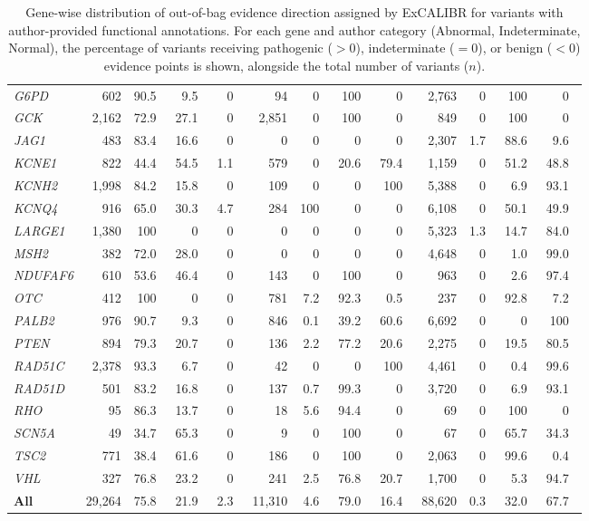 \documentclass[11pt]{article}
\theoremstyle{plain}
\newcommand{\excalibr}{ExCALIBR\xspace}
\begin{document}
\begin{table}[!htb]
{{\begin{tabular}{@{}l rrrr rrrr rrrr@{}}
\textit{G6PD} & 602 & 90.5\ & 9.5\ & 0\ & 94 & 0\ & 100\ & 0\ & 2,763 & 0\ & 100\ & 0\ \\
\textit{GCK} & 2,162 & 72.9\ & 27.1\ & 0\ & 2,851 & 0\ & 100\ & 0\ & 849 & 0\ & 100\ & 0\ \\
\textit{JAG1} & 483 & 83.4\ & 16.6\ & 0\ & 0 & 0\ & 0\ & 0\ & 2,307 & 1.7\ & 88.6\ & 9.6\ \\
\textit{KCNE1} & 822 & 44.4\ & 54.5\ & 1.1\ & 579 & 0\ & 20.6\ & 79.4\ & 1,159 & 0\ & 51.2\ & 48.8\ \\
\textit{KCNH2} & 1,998 & 84.2\ & 15.8\ & 0\ & 109 & 0\ & 0\ & 100\ & 5,388 & 0\ & 6.9\ & 93.1\ \\
\textit{KCNQ4} & 916 & 65.0\ & 30.3\ & 4.7\ & 284 & 100\ & 0\ & 0\ & 6,108 & 0\ & 50.1\ & 49.9\ \\
\textit{LARGE1} & 1,380 & 100\ & 0\ & 0\ & 0 & 0\ & 0\ & 0\ & 5,323 & 1.3\ & 14.7\ & 84.0\ \\
\textit{MSH2} & 382 & 72.0\ & 28.0\ & 0\ & 0 & 0\ & 0\ & 0\ & 4,648 & 0\ & 1.0\ & 99.0\ \\
\textit{NDUFAF6} & 610 & 53.6\ & 46.4\ & 0\ & 143 & 0\ & 100\ & 0\ & 963 & 0\ & 2.6\ & 97.4\ \\
\textit{OTC} & 412 & 100\ & 0\ & 0\ & 781 & 7.2\ & 92.3\ & 0.5\ & 237 & 0\ & 92.8\ & 7.2\ \\
\textit{PALB2} & 976 & 90.7\ & 9.3\ & 0\ & 846 & 0.1\ & 39.2\ & 60.6\ & 6,692 & 0\ & 0\ & 100\ \\
\textit{PTEN} & 894 & 79.3\ & 20.7\ & 0\ & 136 & 2.2\ & 77.2\ & 20.6\ & 2,275 & 0\ & 19.5\ & 80.5\ \\
\textit{RAD51C} & 2,378 & 93.3\ & 6.7\ & 0\ & 42 & 0\ & 0\ & 100\ & 4,461 & 0\ & 0.4\ & 99.6\ \\
\textit{RAD51D} & 501 & 83.2\ & 16.8\ & 0\ & 137 & 0.7\ & 99.3\ & 0\ & 3,720 & 0\ & 6.9\ & 93.1\ \\
\textit{RHO} & 95 & 86.3\ & 13.7\ & 0\ & 18 & 5.6\ & 94.4\ & 0\ & 69 & 0\ & 100\ & 0\ \\
\textit{SCN5A} & 49 & 34.7\ & 65.3\ & 0\ & 9 & 0\ & 100\ & 0\ & 67 & 0\ & 65.7\ & 34.3\ \\
\textit{TSC2} & 771 & 38.4\ & 61.6\ & 0\ & 186 & 0\ & 100\ & 0\ & 2,063 & 0\ & 99.6\ & 0.4\ \\
\textit{VHL} & 327 & 76.8\ & 23.2\ & 0\ & 241 & 2.5\ & 76.8\ & 20.7\ & 1,700 & 0\ & 5.3\ & 94.7\ \\
\midrule
\textbf{All} & 29,264 & 75.8\ & 21.9\ & 2.3\ & 11,310 & 4.6\ & 79.0\ & 16.4\ & 88,620 & 0.3\ & 32.0\ & 67.7\ \\
\bottomrule
\end{tabular}}
}
\caption{Gene-wise distribution of out-of-bag evidence direction assigned by \excalibr for variants with author-provided functional annotations. For each gene and author category (Abnormal, Indeterminate, Normal), the percentage of variants receiving pathogenic ($>0$), indeterminate ($=0$), or benign ($<0$) evidence points is shown, alongside the total number of variants ($n$).}
\label{tab:gene_evidence_distr_auth}
\end{table}
\end{document}
